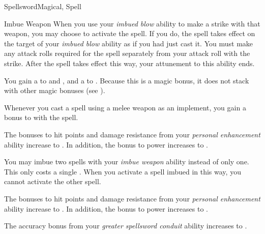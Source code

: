 \begin{feat}{Spellsword}{Magical, Spell}
\begin{attuneability}{Imbue Weapon}
            When you use your \textit{imbued blow} ability to make a strike with that weapon, you may choose to activate the spell.
            If you do, the spell takes effect on the target of your \textit{imbued blow} ability as if you had just cast it.
            You must make any attack rolls required for the spell separately from your attack roll with the strike.
            After the spell takes effect this way, your attunement to this ability ends.
        \end{attuneability}

         You gain a   to  and , and a   to .
        Because this is a magic bonus, it does not stack with other magic bonuses (see ).

         Whenever you cast a spell using a melee weapon as an implement, you gain a  bonus to  with the spell.

         The bonuses to hit points and damage resistance from your \textit{personal enhancement} ability increase to .
        In addition, the bonus to power increases to .

         You may imbue two spells with your \textit{imbue weapon} ability instead of only one.
        This only costs a single .
        When you activate a spell imbued in this way, you  cannot activate the other spell.

         The bonuses to hit points and damage resistance from your \textit{personal enhancement} ability increase to .
        In addition, the bonus to power increases to .

         The accuracy bonus from your \textit{greater spellsword conduit} ability increases to .
    \end{feat}

